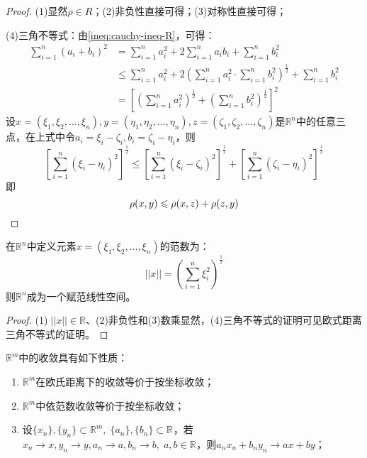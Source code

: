 \begin{proof}
	(1)显然$\rho\in R$；(2)非负性直接可得；(3)对称性直接可得；\par
	(4)三角不等式：由\cref{ineq:cauchy-ineq-R}，可得：
	\begin{align*}
		\sum_{i=1}^n(a_i+b_i)^2&=\sum_{i=1}^na_i^2+2\sum_{i=1}^na_ib_i+\sum_{i=1}^nb_i^2 \\
		&\leqslant\sum_{i=1}^na_i^2+2\left(\sum_{i=1}^na_i^2\cdot\sum_{i=1}^nb_i^2\right)^{\frac{1}{2}}+\sum_{i=1}^nb_i^2 \\
		&=\left[\left(\sum_{i=1}^na_i^2\right)^{\frac{1}{2}}+\left(\sum_{i=1}^nb_i^2\right)^{\frac{1}{2}}\right]^2
	\end{align*}
	设$x=(\xi_1,\xi_2,\dots,\xi_n),y=(\eta_1,\eta_2,\dots,\eta_n),z=(\zeta_1,\zeta_2,\dots,\zeta_n)$是$\mathbb{R}^n$中的任意三点，在上式中令$a_i=\xi_i-\zeta_i,b_i=\zeta_i-\eta_i$，则
	\begin{equation*}
		\left[\sum_{i=1}^n(\xi_i-\eta_i)^2\right]^{\frac{1}{2}}\leqslant	\left[\sum_{i=1}^n(\xi_i-\zeta_i)^2\right]^{\frac{1}{2}}+\left[\sum_{i=1}^n(\zeta_i-\eta_i)^2\right]^{\frac{1}{2}}
	\end{equation*}
	即
	\begin{equation*}
		\rho(x,y)\leqslant\rho(x,z)+\rho(z,y)\qedhere
	\end{equation*}
\end{proof}
\begin{definition}
	在$\mathbb{R}^n$中定义元素$x=(\xi_1,\xi_2,\dots,\xi_n)$的范数为：
	\begin{equation*}
		||x||=\left(\sum_{i=1}^n\xi_i^2\right)^{\frac{1}{2}}
	\end{equation*}
	则$\mathbb{R}^n$成为一个赋范线性空间。
\end{definition}
\begin{proof}
	(1)$\;||x||\in\mathbb{R}$、(2)非负性和(3)数乘显然，(4)三角不等式的证明可见欧式距离三角不等式的证明。
\end{proof}
\begin{property}\label{prop:RmConvergence}
	$\mathbb{R}^{m}$中的收敛具有如下性质：
	\begin{enumerate}
		\item $\mathbb{R}^{m}$在欧氏距离下的收敛等价于按坐标收敛；
		\item $\mathbb{R}^{m}$中依范数收敛等价于按坐标收敛；
		\item 设$\{x_n\},\{y_n\}\subset\mathbb{R}^{m},\;\{a_n\},\{b_n\}\subset\mathbb{R}^{}$，若$x_n\to x,y_n\to y,a_n\to a,b_n\to b,\;a,b\in\mathbb{R}^{}$，则$a_nx_n+b_ny_n\to ax+by$；
	\end{enumerate}
\end{property}
